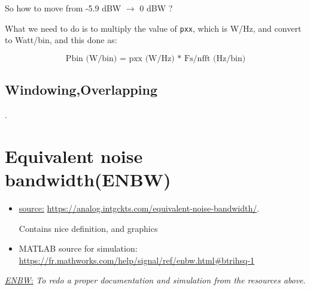 So how to move from -5.9 dBW $\rightarrow$ 0 dBW ?

What we need to do is to multiply the value of \verb|pxx|, which is W/Hz, and convert to Watt/bin, and this done as:

\begin{equation}
 \text{Pbin (W/bin) = pxx (W/Hz) * Fs/nfft (Hz/bin)}
\end{equation}

\subsection{Windowing,Overlapping}

.

\newpage
\section{Equivalent noise bandwidth(ENBW)}

\begin{itemize}

\item \underline{source:} \url{https://analog.intgckts.com/equivalent-noise-bandwidth/}.

Contains nice definition, and graphics

\item  MATLAB source for simulation: \url{https://fr.mathworks.com/help/signal/ref/enbw.html#btrihsq-1}

\end{itemize}

 \underline{\textit{ENBW}:} \textit{To redo a proper documentation and simulation from the resources above}. 